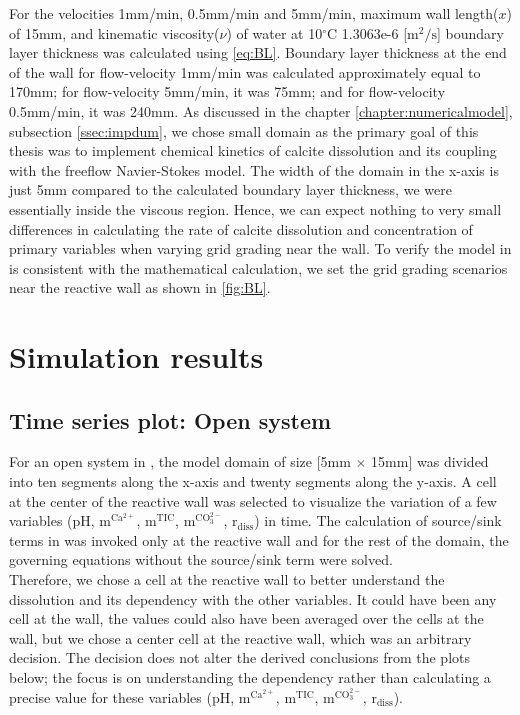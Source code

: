 For the velocities 1mm/min, 0.5mm/min and 5mm/min, maximum wall length($x$) of 15mm, and kinematic viscosity($\nu$) of 
water at 10$^\circ$C 1.3063e-6 [$\mathrm{m^2/s}$] \cite{wagner2008iapws} boundary layer thickness was calculated using \cref{eq:BL}. 
Boundary layer thickness at the end of the wall for flow-velocity 1mm/min was calculated approximately equal to 170mm; 
for flow-velocity 5mm/min, it was 75mm; and for flow-velocity 0.5mm/min, it was 240mm. As discussed in the chapter 
\ref{chapter:numericalmodel}, subsection \ref{ssec:impdum}, we chose small domain as the primary goal of this thesis was to 
implement chemical kinetics of calcite dissolution and its coupling with the freeflow Navier-Stokes model. 
The width of the domain in the x-axis is just 5mm compared to the calculated boundary layer thickness, we were essentially 
inside the viscous region. Hence, we can expect nothing to very small differences in calculating the rate of calcite dissolution and concentration 
of primary variables when varying grid grading near the wall. To verify the model in \DuMuX is 
consistent with the mathematical calculation, we set the grid grading scenarios near the reactive wall as shown in \cref{fig:BL}. \\

\section{\DuMuX Simulation results}

\subsection{Time series plot: Open system}\label{ssec:timeSeriesOpen}
For an open system in \DuMuX, the model domain of size [5mm $\times$ 15mm] was divided into ten segments along the x-axis and twenty segments along the y-axis.
A cell at the center of the reactive wall was selected to visualize the variation of a few variables (pH, $\mathrm{m^{Ca^{2+}}}$, $\mathrm{m^{TIC}}$, 
$\mathrm{m^{CO_3^{2-}}}$, $\mathrm{r_{diss}}$) in time. The calculation of source/sink terms in \DuMuX was invoked only at the reactive wall and for the rest of 
the domain, the governing equations without the source/sink term were solved. \\
Therefore, we chose a cell at the reactive wall to better understand the dissolution
and its dependency with the other variables. It could have been any cell at the wall, the values could also have been averaged over the cells at the wall, but we 
chose a center cell at the reactive wall, which was an arbitrary decision. The decision does not alter the derived conclusions from the plots below; the focus is on 
understanding the dependency rather than calculating a precise value for these variables (pH, $\mathrm{m^{Ca^{2+}}}$, $\mathrm{m^{TIC}}$, 
$\mathrm{m^{CO_3^{2-}}}$, $\mathrm{r_{diss}}$).


